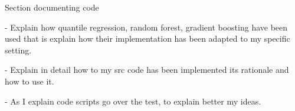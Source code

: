 Section documenting code

- Explain how quantile regression,
random forest, gradient boosting have been used
that is explain how their implementation has been
adapted to my specific setting.

- Explain in detail how to my src code has been implemented
its rationale and how to use it.

- As I explain code scripts go over the test, to 
explain better my ideas.